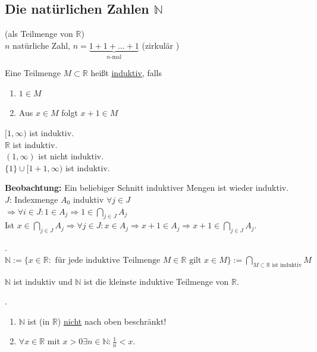 \documentclass[../ana1.tex]{subfiles}
\begin{document}
\subsection{Die natürlichen Zahlen $\mathbb{N}$}
(als Teilmenge von $\mathbb{R}$)\\
$n$ natürliche Zahl, $n=\underbrace{1+1+\ldots + 1}_{n\text{-mal}}$ (zirkulär \Lightning)
\begin{defi}
	Eine Teilmenge $M\subset \mathbb{R}$ heißt \underline{induktiv}, falls
	\begin{enumerate}
		\item $1\in M$
		\item Aus $x\in M$ folgt $x+1 \in M$
	\end{enumerate}
\end{defi}
\begin{bsp}
	$[1,\infty)$ ist induktiv.\\
	$\mathbb{R}$ ist induktiv.\\
	$(1,\infty)$ ist nicht induktiv.\\
	$\{1\} \cup [1+1,\infty)$ ist induktiv.
\end{bsp}
\textbf{Beobachtung:} Ein beliebiger Schnitt induktiver Mengen ist wieder induktiv.\\
$J$: Indexmenge $A_0$ induktiv $\forall j\in J$\\
$\Rightarrow \forall i\in J: 1\in A_j \Rightarrow 1\in \underset{j\in J}{\bigcap} A_j$\\
Ist $x\in \underset{j\in J}{\bigcap} A_j\Rightarrow \forall j \in J: x\in A_j \Rightarrow x+1 \in A_j \Rightarrow x+1 \in \underset{j\in J}{\bigcap} A_j$.
\begin{defi} .\\ %
	$\mathbb{N} := \{x\in \mathbb{R}: \text{ für jede induktive Teilmenge } M\in\mathbb{R} \text{ gilt } x\in M\} := \underset{M\subset \mathbb{R}\text{ ist induktiv}}{\bigcap} M$
\end{defi}
\begin{bem}
	$\mathbb{N}$ ist induktiv und $\mathbb{N}$ ist die kleinste induktive Teilmenge von $\mathbb{R}$.
\end{bem}
\begin{satz} .%
	\begin{enumerate}
		\item $\mathbb{N}$ ist (in $\mathbb{R}$) \underline{nicht} nach oben beschränkt!
		\item $\forall x\in\mathbb{R}$ mit $x>0 \exists n\in \mathbb{N}: \frac{1}{n} < x$.
	\end{enumerate}
\end{satz}
\end{document}
